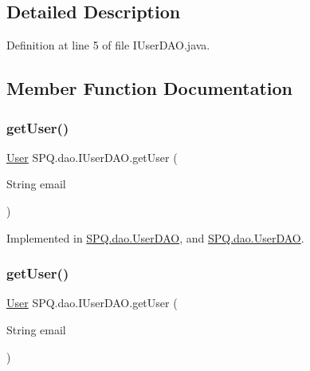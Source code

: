 \subsection{Detailed Description}


Definition at line 5 of file I\+User\+D\+A\+O.\+java.



\subsection{Member Function Documentation}
\mbox{\label{interface_s_p_q_1_1dao_1_1_i_user_d_a_o_ac53b137d5e0828058457e59fa70c2b95}} 
\subsubsection{\texorpdfstring{get\+User()}{getUser()}\hspace{0.1cm}{\footnotesize\ttfamily [1/2]}}
{\footnotesize\ttfamily \mbox{\hyperlink{class_s_p_q_1_1data_1_1_user}{User}} S\+P\+Q.\+dao.\+I\+User\+D\+A\+O.\+get\+User (\begin{DoxyParamCaption}\item[{String}]{email }\end{DoxyParamCaption})}



Implemented in \mbox{\hyperlink{class_s_p_q_1_1dao_1_1_user_d_a_o_aeb3901e9e260ad977a1b412fe7a9fc0e}{S\+P\+Q.\+dao.\+User\+D\+AO}}, and \mbox{\hyperlink{class_s_p_q_1_1dao_1_1_user_d_a_o_aeb3901e9e260ad977a1b412fe7a9fc0e}{S\+P\+Q.\+dao.\+User\+D\+AO}}.

\mbox{\label{interface_s_p_q_1_1dao_1_1_i_user_d_a_o_ac53b137d5e0828058457e59fa70c2b95}} 
\subsubsection{\texorpdfstring{get\+User()}{getUser()}\hspace{0.1cm}{\footnotesize\ttfamily [2/2]}}
{\footnotesize\ttfamily \mbox{\hyperlink{class_s_p_q_1_1data_1_1_user}{User}} S\+P\+Q.\+dao.\+I\+User\+D\+A\+O.\+get\+User (\begin{DoxyParamCaption}\item[{String}]{email }\end{DoxyParamCaption})}




